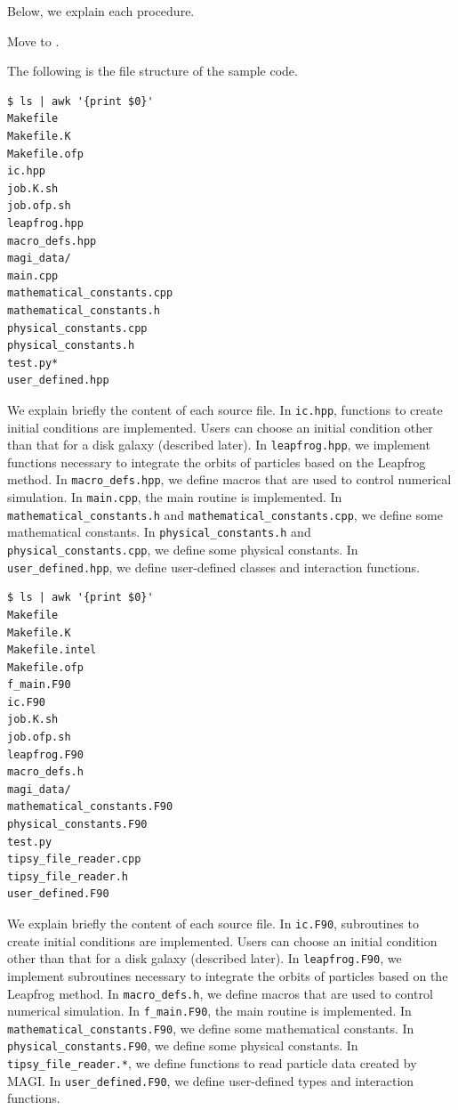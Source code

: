 Below, we explain each procedure.

\label{s3sec:NbosySPH_code_loc}
Move to \dirNameNbodySPHSample.

\label{s3sec:NbodySPH_file_str}
The following is the file structure of the sample code.
\ifCpp %
\begin{screen}
\begin{verbatim}
$ ls | awk '{print $0}'
Makefile
Makefile.K
Makefile.ofp
ic.hpp
job.K.sh
job.ofp.sh
leapfrog.hpp
macro_defs.hpp
magi_data/
main.cpp
mathematical_constants.cpp
mathematical_constants.h
physical_constants.cpp
physical_constants.h
test.py*
user_defined.hpp
\end{verbatim}
\end{screen}
We explain briefly the content of each source file. In \texttt{ic.hpp}, functions to create initial conditions are implemented. Users can choose an initial condition other than that for a disk galaxy (described later). In \texttt{leapfrog.hpp}, we implement functions necessary to integrate the orbits of particles based on the Leapfrog method. In \texttt{macro\_defs.hpp}, we define macros that are used to control numerical simulation. In \texttt{main.cpp}, the main routine is implemented. In \texttt{mathematical\_constants.h} and \texttt{mathematical\_constants.cpp}, we define some mathematical constants. In \texttt{physical\_constants.h} and \texttt{physical\_constants.cpp}, we define some physical constants. In \texttt{user\_defined.hpp}, we define user-defined classes and interaction functions.
\endifCpp
\ifFtn %
\begin{screen}
\begin{verbatim}
$ ls | awk '{print $0}'
Makefile
Makefile.K
Makefile.intel
Makefile.ofp
f_main.F90
ic.F90
job.K.sh
job.ofp.sh
leapfrog.F90
macro_defs.h
magi_data/
mathematical_constants.F90
physical_constants.F90
test.py
tipsy_file_reader.cpp
tipsy_file_reader.h
user_defined.F90
\end{verbatim}
\end{screen}
We explain briefly the content of each source file. In \texttt{ic.F90}, subroutines to create initial conditions are implemented. Users can choose an initial condition other than that for a disk galaxy (described later). In \texttt{leapfrog.F90}, we implement subroutines necessary to integrate the orbits of particles based on the Leapfrog method. In \texttt{macro\_defs.h}, we define macros that are used to control numerical simulation. In \texttt{f\_main.F90}, the main routine is implemented. In \texttt{mathematical\_constants.F90}, we define some mathematical constants. In \texttt{physical\_constants.F90}, we define some physical constants. In \texttt{tipsy\_file\_reader.*}, we define functions to read particle data created by \textsc{MAGI}. In \texttt{user\_defined.F90}, we define user-defined types and interaction functions.
